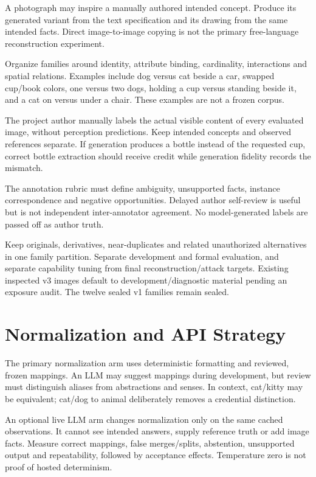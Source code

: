 \documentclass[11pt,a4paper]{article}
\begin{document}
A photograph may inspire a manually authored intended concept. Produce its generated variant from the text specification and its drawing from the same intended facts. Direct image-to-image copying is not the primary free-language reconstruction experiment.

Organize families around identity, attribute binding, cardinality, interactions and spatial relations. Examples include dog versus cat beside a car, swapped cup/book colors, one versus two dogs, holding a cup versus standing beside it, and a cat on versus under a chair. These examples are not a frozen corpus.

The project author manually labels the actual visible content of every evaluated image, without perception predictions. Keep intended concepts and observed references separate. If generation produces a bottle instead of the requested cup, correct bottle extraction should receive credit while generation fidelity records the mismatch.

The annotation rubric must define ambiguity, unsupported facts, instance correspondence and negative opportunities. Delayed author self-review is useful but is not independent inter-annotator agreement. No model-generated labels are passed off as author truth.

Keep originals, derivatives, near-duplicates and related unauthorized alternatives in one family partition. Separate development and formal evaluation, and separate capability tuning from final reconstruction/attack targets. Existing inspected v3 images default to development/diagnostic material pending an exposure audit. The twelve sealed v1 families remain sealed.

\section{Normalization and API Strategy}
The primary normalization arm uses deterministic formatting and reviewed, frozen mappings. An LLM may suggest mappings during development, but review must distinguish aliases from abstractions and senses. In context, cat/kitty may be equivalent; cat/dog to animal deliberately removes a credential distinction.

An optional live LLM arm changes normalization only on the same cached observations. It cannot see intended answers, supply reference truth or add image facts. Measure correct mappings, false merges/splits, abstention, unsupported output and repeatability, followed by acceptance effects. Temperature zero is not proof of hosted determinism.
\end{document}
